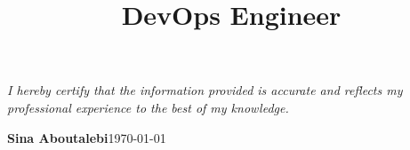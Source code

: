 \documentclass[11pt, a4paper, sans, final]{moderncv}
\title{DevOps Engineer}
\begin{document}
\maketitle





%

\emptysection{}\closesection{}
\vfill
\begin{center}
    \textit{I hereby certify that the information provided is accurate and reflects my professional experience to the best of my knowledge.}
    \vspace{1em}

    \textbf{Sina Aboutalebi}\hspace{4cm}\today
\end{center}
\end{document}
